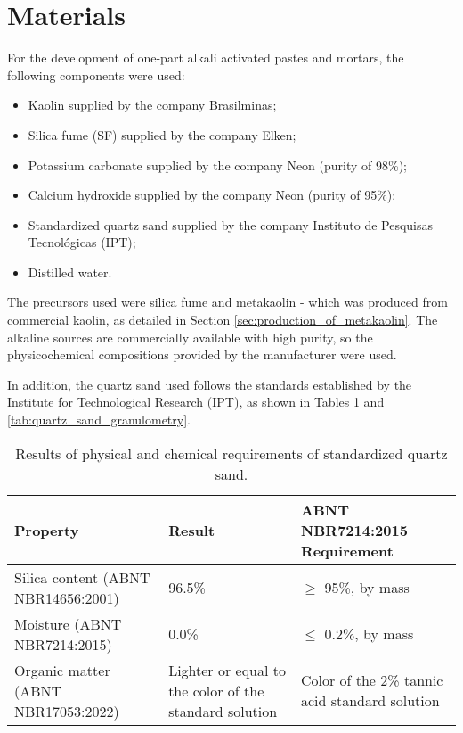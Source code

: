 \section{Materials}
\label{sec:materials}

For the development of one-part alkali activated pastes and mortars, the following components were used:

\begin{itemize}
    \item Kaolin supplied by the company Brasilminas;
    \item Silica fume (SF) supplied by the company Elken;
    \item Potassium carbonate supplied by the company Neon (purity of 98\%);
    \item Calcium hydroxide supplied by the company Neon  (purity of 95\%);
    \item Standardized quartz sand supplied by the company Instituto de Pesquisas Tecnológicas (IPT);
    \item Distilled water.
\end{itemize}

The precursors used were silica fume and metakaolin - which  was produced from commercial kaolin, as detailed in Section \ref{sec:production_of_metakaolin}.
The alkaline sources are commercially available with high purity, so the physicochemical compositions provided by the manufacturer were used.

In addition, the quartz sand used follows the standards established by the Institute for Technological Research (IPT), as shown in Tables \ref{tab:quartz_sand_properties} and \ref{tab:quartz_sand_granulometry}.

\begin{table}[H]
    \caption{Results of physical and chemical requirements of standardized quartz sand.}
    \label{tab:quartz_sand_properties}
    \center
    \begin{tabular}{p{} p{} p{}}
        \hline
        Property & Result & ABNT NBR7214:2015 Requirement\\
        \hline
        Silica content (ABNT NBR14656:2001) & 96.5\% & $\geq$ 95\%, by mass \\
        Moisture (ABNT NBR7214:2015) & 0.0\% & $\leq$ 0.2\%, by mass \\
        Organic matter (ABNT NBR17053:2022) & Lighter or equal to the color of the standard solution & Color of the 2\% tannic acid standard solution \\
        \hline
    \end{tabular}
\end{table}

